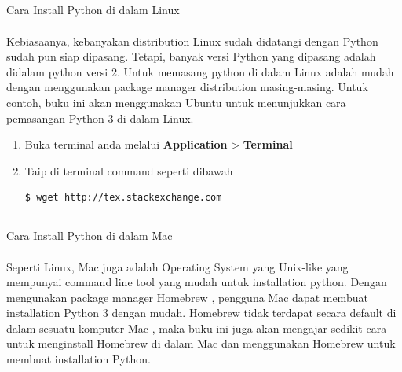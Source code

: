 \subsection{}
Cara Install Python di dalam Linux

\paragraph{}
Kebiasaanya, kebanyakan distribution Linux sudah didatangi dengan Python sudah pun siap dipasang. Tetapi, banyak versi Python yang dipasang adalah didalam python versi 2. Untuk memasang python di dalam Linux adalah mudah dengan menggunakan package manager distribution masing-masing. Untuk contoh, buku ini akan menggunakan Ubuntu untuk menunjukkan cara pemasangan Python 3 di dalam Linux.

\begin{enumerate}
	\item Buka terminal anda melalui \textbf{Application} > \textbf{Terminal} 
	\item Taip di terminal command seperti dibawah
		\begin{lstlisting}[language=bash]
		  $ wget http://tex.stackexchange.com
		\end{lstlisting}


\end{enumerate}

\subsection{}
Cara Install Python di dalam Mac

\paragraph{}
Seperti Linux, Mac juga adalah Operating System yang Unix-like yang mempunyai command line tool yang mudah untuk installation python. Dengan mengunakan package manager Homebrew , pengguna Mac dapat membuat installation Python 3 dengan mudah.
Homebrew tidak terdapat secara default di dalam sesuatu komputer Mac , maka buku ini juga akan mengajar sedikit cara untuk menginstall Homebrew di dalam Mac dan menggunakan Homebrew untuk membuat installation Python.

